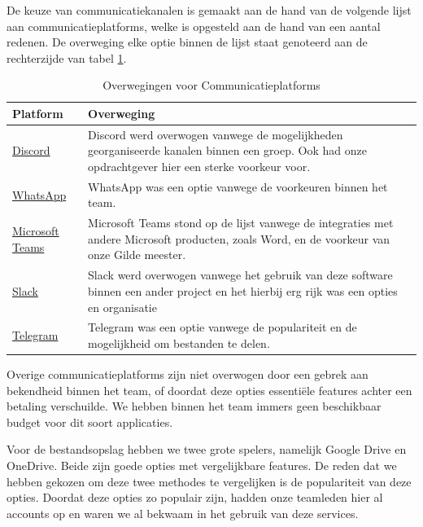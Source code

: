 \documentclass[a4paper]{report}
\begin{document}
De keuze van communicatiekanalen is gemaakt aan de hand van de volgende lijst aan communicatieplatforms, welke is opgesteld aan de hand van een aantal redenen.
De overweging elke optie binnen de lijst staat genoteerd aan de rechterzijde van tabel \ref{tab:comm_platforms}.
\begin{table}[H]
  \centering
  \begin{tabular}{|l|p{10cm}|}
    \hline
    \textbf{Platform} & \textbf{Overweging} \\
    \hline
    \href{https://discord.com/}{Discord} & Discord werd overwogen vanwege de mogelijkheden georganiseerde kanalen binnen een groep. Ook had onze opdrachtgever hier een sterke voorkeur voor. \\
    \hline
    \href{https://www.whatsapp.com/}{WhatsApp} & WhatsApp was een optie vanwege de voorkeuren binnen het team. \\
    \hline
    \href{https://www.microsoft.com/en-us/microsoft-teams/group-chat-software}{Microsoft Teams} & Microsoft Teams stond op de lijst vanwege de integraties met andere Microsoft producten, zoals Word, en de voorkeur van onze Gilde meester. \\
    \hline
    \href{https://slack.com/}{Slack} & Slack werd overwogen vanwege het gebruik van deze software binnen een ander project en het hierbij erg rijk was een opties en organisatie \\
    \hline
    \href{https://telegram.org/}{Telegram} & Telegram was een optie vanwege de populariteit en de mogelijkheid om bestanden te delen. \\
    \hline
  \end{tabular}
  \caption{Overwegingen voor Communicatieplatforms}
  \label{tab:comm_platforms}
\end{table}
Overige communicatieplatforms zijn niet overwogen door een gebrek aan bekendheid binnen het team, of doordat deze opties essentiële features achter een betaling verschuilde.
We hebben binnen het team immers geen beschikbaar budget voor dit soort applicaties.
\par\smallskip
Voor de bestandsopslag hebben we twee grote spelers, namelijk Google Drive en OneDrive. 
Beide zijn goede opties met vergelijkbare features. De reden dat we hebben gekozen om deze twee methodes te vergelijken is de populariteit van deze opties.
Doordat deze opties zo populair zijn, hadden onze teamleden hier al accounts op en waren we al bekwaam in het gebruik van deze services.
\end{document}
